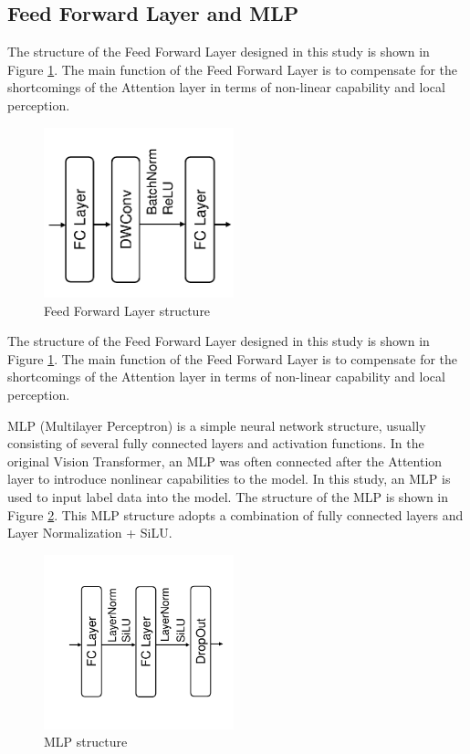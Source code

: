\documentclass{acsman}
\begin{document}
\subsection{Feed Forward Layer and MLP}
The structure of the Feed Forward Layer designed in this study is shown in Figure \ref{fig:FFL}. The main function of the Feed Forward Layer is to compensate for the shortcomings of the Attention layer in terms of non-linear capability and local perception.
\begin{figure}[H]
    \centering
    \includegraphics[width=5.5cm]{image/FFL_sum.pdf}
    \caption{Feed Forward Layer structure}
    \label{fig:FFL}
\end{figure}
The structure of the Feed Forward Layer designed in this study is shown in Figure \ref{fig:FFL}. The main function of the Feed Forward Layer is to compensate for the shortcomings of the Attention layer in terms of non-linear capability and local perception.

MLP (Multilayer Perceptron) is a simple neural network structure, usually consisting of several fully connected layers and activation functions. In the original Vision Transformer, an MLP was often connected after the Attention layer to introduce nonlinear capabilities to the model. In this study, an MLP is used to input label data into the model. The structure of the MLP is shown in Figure \ref{fig:MLP}. This MLP structure adopts a combination of fully connected layers and Layer Normalization + SiLU. 

\begin{figure}[H]
    \centering
    \includegraphics[width=5.5cm]{image/MLP_sum.pdf}
    \caption{MLP structure}
    \label{fig:MLP}
\end{figure}
\end{document}
